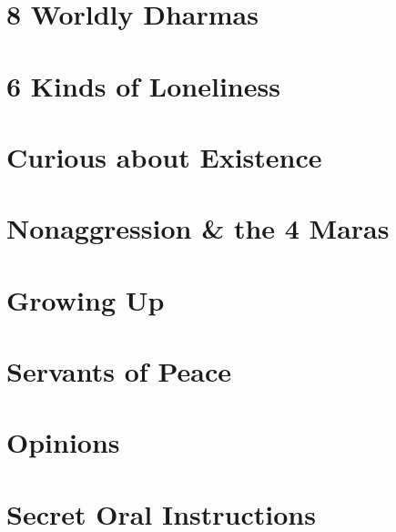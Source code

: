 \documentclass[oneside]{book}
\numberwithin{equation}{section}
\begin{document}
\section{8 Worldly Dharmas}


\section{6 Kinds of Loneliness}


\section{Curious about Existence}


\section{Nonaggression \& the 4 Maras}


\section{Growing Up}


\section{Servants of Peace}


\section{Opinions}


\section{Secret Oral Instructions}
\end{document}
